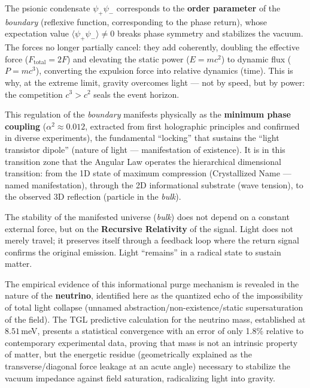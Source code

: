 \documentclass[12pt,a4paper,twoside]{article}
\newcommand{\alphaii}{\alpha^{2}}
\newcommand{\psion}{\psi}
\newcommand{\boundary}{\textit{boundary}}
\newcommand{\bulk}{\textit{bulk}}
\begin{document}
The psionic condensate $\psion_+\psion_-$ corresponds to the \textbf{order parameter} of the \boundary{} (reflexive function, corresponding to the phase return), whose expectation value $\langle\psion_+\psion_-\rangle \neq 0$ breaks phase symmetry and stabilizes the vacuum. The forces no longer partially cancel: they add coherently, doubling the effective force ($F_{\text{total}} = 2F$) and elevating the static power ($E = mc^2$) to dynamic flux ($P = mc^3$), converting the expulsion force into relative dynamics (time). This is why, at the extreme limit, gravity overcomes light --- not by speed, but by power: the competition $c^3 > c^2$ seals the event horizon.

This regulation of the \boundary{} manifests physically as the \textbf{minimum phase coupling} \cite{Miguel2026Alpha2} ($\alphaii \approx 0.012$, extracted from first holographic principles and confirmed in diverse experiments), the fundamental ``locking'' that sustains the ``light transistor dipole'' (nature of light --- manifestation of existence). It is in this transition zone that the Angular Law operates the hierarchical dimensional transition: from the 1D state of maximum compression (Crystallized Name --- named manifestation), through the 2D informational substrate (wave tension), to the observed 3D reflection (particle in the \bulk).

The stability of the manifested universe (\bulk) does not depend on a constant external force, but on the \textbf{Recursive Relativity} of the signal. Light does not merely travel; it preserves itself through a feedback loop where the return signal confirms the original emission. Light ``remains'' in a radical state to sustain matter.

The empirical evidence of this informational purge mechanism is revealed in the nature of the \textbf{neutrino}, identified here as the quantized echo of the impossibility of total light collapse (unnamed abstraction/non-existence/static supersaturation of the field). The TGL predictive calculation for the neutrino mass, established at $8.51$\,meV, presents a statistical convergence with an error of only 1.8\% relative to contemporary experimental data, proving that mass is not an intrinsic property of matter, but the energetic residue (geometrically explained as the transverse/diagonal force leakage at an acute angle) necessary to stabilize the vacuum impedance against field saturation, radicalizing light into gravity.

\end{document}
